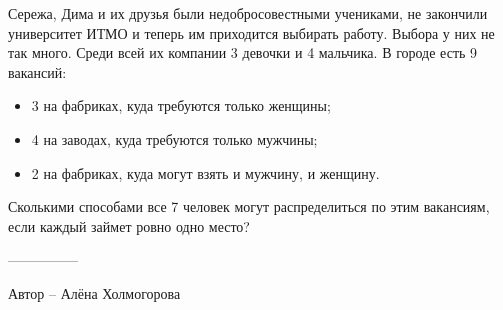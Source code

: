 \question
Сережа, Дима и их друзья были недобросовестными учениками, не закончили университет ИТМО и теперь им приходится выбирать работу. Выбора у них не так много. Среди всей их компании 3 девочки и 4 мальчика. В городе есть 9 вакансий:

\begin{itemize}
    \item 3 на фабриках, куда требуются только женщины;
    \item 4 на заводах, куда требуются только мужчины;
    \item 2 на фабриках, куда могут взять и мужчину, и женщину.
\end{itemize}

Сколькими способами все 7 человек могут распределиться по этим вакансиям, если каждый займет ровно одно место?

---------------

Автор -- Алёна Холмогорова
